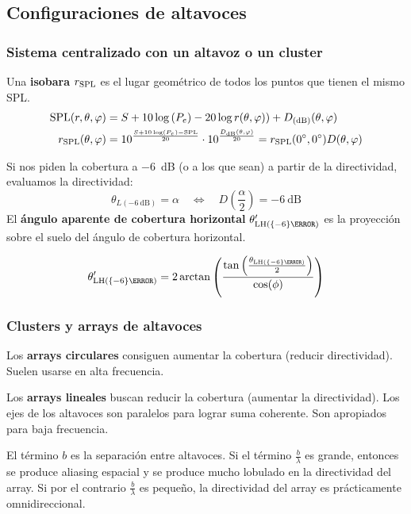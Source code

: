 \documentclass[a4paper, 8pt]{extarticle}
\begin{document}
\begin{multicols}{3}
  \subsection{Configuraciones de altavoces}
  \subsubsection{Sistema centralizado con un altavoz o un cluster}
  Una \textbf{isobara} $r_{\textnormal{SPL}}$ es el lugar geométrico de todos los puntos que tienen el mismo SPL.
  \begin{align*}
    \text{SPL}(r, \theta, \varphi)        & = S + 10 \log \left( P_e \right) - 20 \log r(\theta, \varphi)) + D_{\left( \unit{\dB} \right)}(\theta, \varphi)                                                                   \\
    r_{\textnormal{SPL}}(\theta, \varphi) & = 10^{ \frac{S + 10 \log \left( P_e \right) - \text{SPL}}{20} } \cdot 10 ^{\frac{D_{\unit{\dB}}(\theta, \varphi)}{20}} = r_{\textnormal{SPL}}(\ang{0},\ang{0}) D(\theta, \varphi)
  \end{align*}

  Si nos piden la cobertura a \qty{-6}{\dB} (o a los que sean) a partir de la directividad, evaluamos la directividad:
  \[ \theta _{L \left( \qty{-6}{\dB} \right)} = \alpha \quad \Longleftrightarrow \quad D \left( \frac{\alpha}{2} \right) = \qty{-6}{\dB}\]
  El \textbf{ángulo aparente de cobertura horizontal} $\theta ' _{\textnormal{LH}\left( \qty{-6}{\dB}  \right)}$ es la proyección sobre el suelo del ángulo de cobertura horizontal.

  \[ \theta ' _{\textnormal{LH}\left( \qty{-6}{\dB}  \right)} = 2 \arctan \left( \frac{\tan \left( \frac{\theta _{\textnormal{LH}\left( \qty{-6}{\dB}  \right)}}{2} \right)}{\cos (\phi)} \right) \]

  \subsubsection{Clusters y arrays de altavoces}

  Los \textbf{arrays circulares} consiguen aumentar la cobertura (reducir directividad). Suelen usarse en alta frecuencia.



  Los \textbf{arrays lineales} buscan reducir la cobertura (aumentar la directividad). Los ejes de los altavoces son paralelos para lograr suma coherente. Son apropiados para baja frecuencia.

  El término $b$ es la separación entre altavoces. Si el término $\frac{b}{\lambda}$ es grande, entonces se produce aliasing espacial y se produce mucho lobulado en la directividad del array. Si por el contrario $\frac{b}{\lambda}$ es pequeño, la directividad del array es prácticamente omnidireccional.


\end{multicols}
\end{document}

